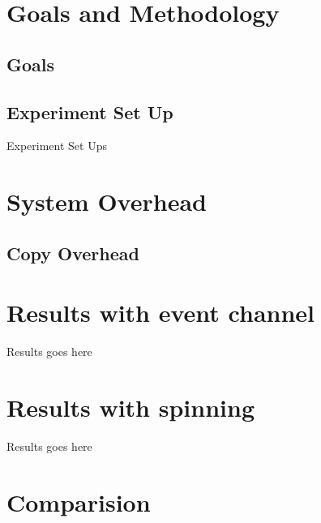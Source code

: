 
\section{Goals and Methodology}

\subsection{Goals}

\subsection {Experiment Set Up}

Experiment Set Ups 

\pagebreak
\section{System Overhead}
\subsection{Copy Overhead}
\pagebreak

\section {Results with event channel}

Results goes here
\pagebreak

\section {Results with spinning}

Results goes here
\pagebreak

\section {Comparision}
\pagebreak

